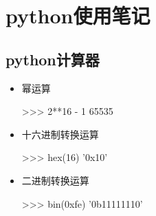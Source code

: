 \section{python使用笔记}
\subsection{python计算器}
\begin{itemize}
\item 幂运算
\begin{commandbox}
>>> 2**16 - 1
65535
\end{commandbox}

\item 十六进制转换运算
\begin{commandbox}
>>> hex(16)
'0x10'
\end{commandbox}
\item 二进制转换运算
\begin{commandbox}
>>> bin(0xfe)
'0b11111110'
\end{commandbox}
\end{itemize}


